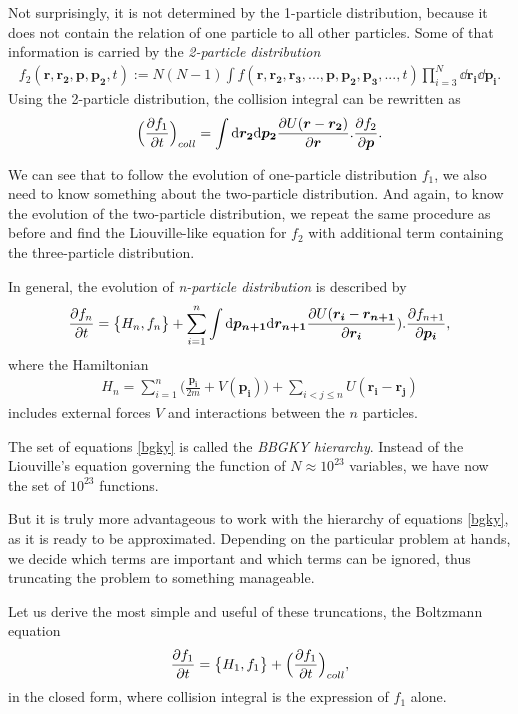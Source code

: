 Not surprisingly, it is not determined by the 1-particle distribution, because it does not contain the relation of one particle to all other particles. Some of that information is carried by the \textit{2-particle distribution}
\begin{align*}
f_2(\bm{r},\bm{r_2},\bm{p},\bm{p_2},t) := N(N-1)\int f(\bm{r},\bm{r_2},\bm{r_3},...,\bm{p},\bm{p_2},\bm{p_3},...,t) \prod_{i=3}^N \dd \bm{r_i} \dd \bm{p_i}.
\end{align*}
Using the 2-particle distribution, the collision integral can be rewritten as
\begin{align*}
\Big(\frac{\partial f_1}{\partial t} \Big)_{coll} = \int \mathrm{d} \bm{r_2} \mathrm{d} \bm{p_2} \frac{\partial U(\bm{r} - \bm{r_2})}{\partial \bm{r}} . \frac{\partial f_2}{\partial\bm{p}}.
\end{align*}

We can see that to follow the evolution of one-particle distribution $f_1$, we also need to know something about the two-particle distribution. And again, to know the evolution of the two-particle distribution, we repeat the same procedure as before and find the Liouville-like equation for $f_2$ with additional term containing the three-particle distribution.

In general, the evolution of \textit{n-particle distribution} is described by
\begin{align} \label{bgky}
\frac{\partial f_n}{\partial t} = \big\{ H_n, f_n \big\} + \sum_{i=1}^n \int \mathrm{d} \bm{p_{n+1}} \mathrm{d} \bm{r_{n+1}} \frac{\partial U(\bm{r_i} - \bm{r_{n+1}}}{\partial \bm{r_i}}).\frac{\partial f_{n+1}}{\partial \bm{p_i}},
\end{align}
where the Hamiltonian 
\begin{align*}
H_n = \sum_{i=1}^n \Big(\frac{\bm{p_i}}{2m} + V(\bm{p_i})\Big) + \sum_{i<j\leq n} U(\bm{r_i} - \bm{r_j})
\end{align*}
includes external forces $V$ and interactions between the $n$ particles.

The set of equations \ref{bgky} is called the \textit{BBGKY hierarchy}.
Instead of the Liouville's equation governing the function of $N \approx 10^{23}$ variables, we have now the set of $10^{23}$ functions.

But it is truly more advantageous to work with the hierarchy of equations \ref{bgky}, as it is ready to be approximated. Depending on the particular problem at hands, we decide which terms are important and which terms can be ignored, thus truncating the problem to something manageable.

Let us derive the most simple and useful of these truncations, the Boltzmann equation
\begin{align*}
\frac{\partial f_1}{\partial t} = \big\{ H_1, f_1 \big\} + \Big(\frac{\partial f_1}{\partial t} \Big)_{coll},
\end{align*}
in the closed form, where collision integral is the expression of $f_1$ alone.
%

